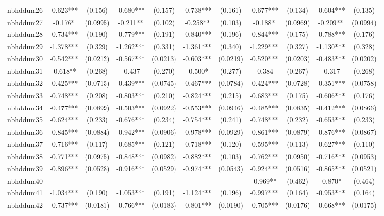 \documentclass[]{article}
\begin{document}
\begin{tabular}{lcccccccccc}
nbhddum26 & -0.623*** & (0.156) & -0.680*** & (0.157) & -0.738*** & (0.161) & -0.677*** & (0.134) & -0.604*** & (0.135) \\
nbhddum27 & -0.176* & (0.0995) & -0.211** & (0.102) & -0.258** & (0.103) & -0.188* & (0.0969) & -0.209** & (0.0994) \\
nbhddum28 & -0.734*** & (0.190) & -0.779*** & (0.191) & -0.840*** & (0.196) & -0.844*** & (0.175) & -0.788*** & (0.176) \\
nbhddum29 & -1.378*** & (0.329) & -1.262*** & (0.331) & -1.361*** & (0.340) & -1.229*** & (0.327) & -1.130*** & (0.328) \\
nbhddum30 & -0.542*** & (0.0212) & -0.567*** & (0.0213) & -0.603*** & (0.0219) & -0.520*** & (0.0203) & -0.483*** & (0.0202) \\
nbhddum31 & -0.618** & (0.268) & -0.437 & (0.270) & -0.500* & (0.277) & -0.384 & (0.267) & -0.317 & (0.268) \\
nbhddum32 & -0.425*** & (0.0715) & -0.439*** & (0.0745) & -0.467*** & (0.0784) & -0.424*** & (0.0728) & -0.351*** & (0.0758) \\
nbhddum33 & -0.748*** & (0.208) & -0.803*** & (0.210) & -0.824*** & (0.215) & -0.683*** & (0.175) & -0.606*** & (0.176) \\
nbhddum34 & -0.477*** & (0.0899) & -0.503*** & (0.0922) & -0.553*** & (0.0946) & -0.485*** & (0.0835) & -0.412*** & (0.0866) \\
nbhddum35 & -0.624*** & (0.233) & -0.676*** & (0.234) & -0.754*** & (0.241) & -0.748*** & (0.232) & -0.653*** & (0.233) \\
nbhddum36 & -0.845*** & (0.0884) & -0.942*** & (0.0906) & -0.978*** & (0.0929) & -0.861*** & (0.0879) & -0.876*** & (0.0867) \\
nbhddum37 & -0.716*** & (0.117) & -0.685*** & (0.121) & -0.718*** & (0.120) & -0.595*** & (0.113) & -0.627*** & (0.110) \\
nbhddum38 & -0.771*** & (0.0975) & -0.848*** & (0.0982) & -0.882*** & (0.103) & -0.762*** & (0.0950) & -0.716*** & (0.0953) \\
nbhddum39 & -0.896*** & (0.0528) & -0.916*** & (0.0529) & -0.974*** & (0.0543) & -0.924*** & (0.0516) & -0.865*** & (0.0521) \\
nbhddum40 &  &  &  &  &  &  & -0.969** & (0.462) & -0.870* & (0.464) \\
nbhddum41 & -1.034*** & (0.190) & -1.053*** & (0.191) & -1.124*** & (0.196) & -0.997*** & (0.164) & -0.953*** & (0.164) \\
nbhddum42 & -0.737*** & (0.0181) & -0.766*** & (0.0183) & -0.801*** & (0.0190) & -0.705*** & (0.0176) & -0.668*** & (0.0175) \\

\end{tabular}
\end{document}
